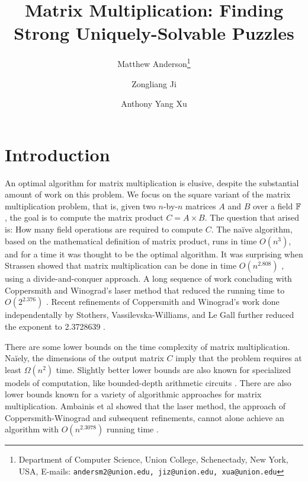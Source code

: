 \documentclass[11pt]{article}
\date{}
\title{Matrix Multiplication: Finding Strong Uniquely-Solvable Puzzles
{\IfFileExists{./sha.tex}{\\\small SHA: }{}}}
\author{
Matthew Anderson\thanks{Department of Computer Science, Union College, Schenectady, New York, USA, E-mails: \texttt{andersm2@union.edu, jiz@union.edu, xua@union.edu}}%
\and%
Zongliang Ji\samethanks[1]
\and%
Anthony Yang Xu\samethanks[1]
}
\begin{document}
\maketitle

\begin{abstract}

\end{abstract}

\thispagestyle{empty}
\newpage
{}


\section{Introduction}
\label{sec:intro}


An optimal algorithm for matrix multiplication is elusive, despite the
substantial amount of work on this problem.  We focus on the square
variant of the matrix multiplication problem, that is, given two
$n$-by-$n$ matrices $A$ and $B$ over a field $\F$, the goal is to
compute the matrix product $C = A \times B$.  The question that arised
is: How many field operations are required to compute $C$.  The
na\"{i}ve algorithm, based on the mathematical definition of matrix
product, runs in time $O(n^3)$, and for a time it was thought to be
the optimal algorithm.  It was surprising when Strassen showed that
matrix multiplication can be done in time $O(n^{2.808})$ \cite{str69},
using a divide-and-conquer approach.  A long sequence of work
concluding with Coppersmith and Winograd's laser method that reduced
the running time to $O(2^{2.376})$
\cite{pan78,b79,sch81,cw82,str86,cw87}. Recent refinements of
Coppersmith and Winograd's work done independentally by Stothers,
Vassilevska-Williams, and Le Gall further reduced the exponent to
2.3728639 \cite{sto10,vas11,leg14}.

There are some lower bounds on the time complexity of matrix
multiplication.  Na\"{i}ely, the dimensions of the output matrix $C$
imply that the problem requires at least $\Omega(n^2)$ time.  Slightly
better lower bounds are also known for specialized models of
computation, like bounded-depth arithmetic circuits \cite{XXX}.  There
are also lower bounds known for a variety of algorithmic approaches
for matrix multiplication.  Ambainis et al showed that the laser
method, the approach of Coppersmith-Winograd and subsequent
refinements, cannot alone achieve an algorithm with $O(n^{2.3078})$
running time \cite{afl14}.
\end{document}
